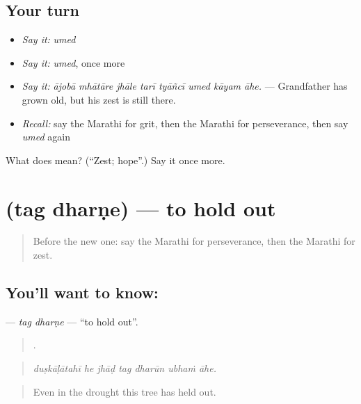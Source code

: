 \subsection*{Your turn}
\begin{itemize}
\raggedright
  \item \emph{Say it:} \emph{umed}
  \item \emph{Say it:} \emph{umed}, once more
  \item \emph{Say it:} \emph{ājobā mhātāre jhāle tarī tyāñcī umed kāyam āhe.} — Grandfather has grown old, but his zest is still there.
  \item \emph{Recall:} say the Marathi for grit, then the Marathi for perseverance, then say \emph{umed} again
\end{itemize}

\begin{tcolorbox}[breakable,colback=teal!4,colframe=teal!35!black,title={Before you move on}]
What does  mean? (\textquotedblleft{}Zest; hope\textquotedblright{}.) Say it once more.
\end{tcolorbox}
\section[\texorpdfstring{\mr{तग} \mr{धरणे} (tag dharṇe)}{तग धरणे (tag dharṇe)}]{  (tag dharṇe) — to hold out}

\label{lesson:MR-C464-tag-dharne}



\begin{quote}
Before the new one: say the Marathi for perseverance, then the Marathi for zest.
\end{quote}

\subsection*{You'll want to know:  }
\textbf{ } — \emph{tag dharṇe} — \textquotedblleft{}to hold out\textquotedblright{}.

\begin{quote}
      .
\end{quote}

\begin{quote}
\emph{duṣkāḷātahī he jhāḍ tag dharūn ubhaṁ āhe.}
\end{quote}

\begin{quote}
Even in the drought this tree has held out.
\end{quote}


